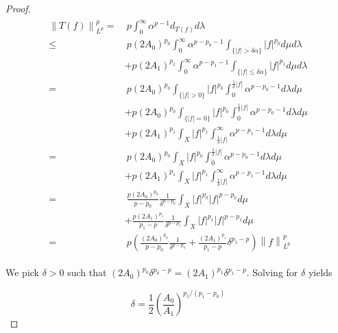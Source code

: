 \begin{proof}
\begin{gather}
	\begin{aligned}
		\left\|T(f)\right\|^p_{L^p} = &~p\int_0^{\infty}\alpha^{p-1}d_{T(f)} d\lambda\\
		\leqslant &~p\left(2A_0\right)^{p_0}\int_0^{\infty}\alpha^{p-p_0-1} \int_{\{\left| f \right| > \delta \alpha\}} \left| f\right|^{p_0}d\mu d\lambda\\
		&+ p(2A_1)^{p_1}\int_0^{\infty}\alpha^{p-p_1-1} \int_{\{\left| f \right| \leqslant \delta \alpha\}} \left| f \right|^{p_1}d\mu d\lambda\\
		= &~p\left(2A_0\right)^{p_0}\int_{\{\left| f \right| > 0\}} \left| f \right|^{p_0} \int_0^{\frac{1}{\delta}\left| f\right|}\alpha^{p-p_0-1} d\lambda d\mu\\
		&+ p\left(2A_0\right)^{p_0}\int_{\{\left| f \right| = 0\}} \left| f \right|^{p_0} \int_0^{\frac{1}{\delta}\left| f\right|}\alpha^{p-p_0-1} d\lambda d\mu\\
		&+ p\left(2A_1\right)^{p_1}\int_X \left| f\right|^{p_1} \int_{\frac{1}{\delta}\left| f\right|}^{\infty}\alpha^{p - p_1 - 1} d\lambda d\mu\\
		= &~p\left(2A_0\right)^{p_0}\int_X \left| f \right|^{p_0} \int_0^{\frac{1}{\delta}\left| f\right|}\alpha^{p-p_0-1} d\lambda d\mu\\
		&+ p\left(2A_1\right)^{p_1}\int_X \left| f\right|^{p_1} \int_{\frac{1}{\delta}\left| f\right|}^{\infty}\alpha^{p - p_1 - 1} d\lambda d\mu\\
		=&~\frac{p\left(2A_0\right)^{p_0}}{p-p_0}\frac{1}{\delta^{p-p_0}}\int_X \left| f \right|^{p_0}\left| f \right|^{p-p_0} d\mu\\
		&+ \frac{p\left(2A_1\right)^{p_1}}{p_1-p}\frac{1}{\delta^{p-p_1}}\int_X \left| f \right|^{p_1} \left| f\right|^{p-p_1}d\mu\\
		= &~p\left( \frac{\left(2A_0\right)^{p_0}}{p - p_0}\frac{1}{\delta^{p - p_0}} + \frac{\left(2A_1\right)^{p_1}}{p_1 - p}\delta^{p_1 - p} \right)\left\|f\right\|_{L^p}^p
	\end{aligned}
	\label{est:Tfp}
\end{gather}

		We pick $\delta > 0$ such that $\left(2A_0\right)^{p_0}\delta^{p_0 - p} = \left(2A_1\right)^{p_1}\delta^{p_1 - p}$. Solving for $\delta$ yields 

		\begin{equation}
			\delta = \frac{1}{2} \left( \frac{A_0}{A_1}\right)^{p_1/(p_1 - p_0)}
		\end{equation}


\end{proof}
